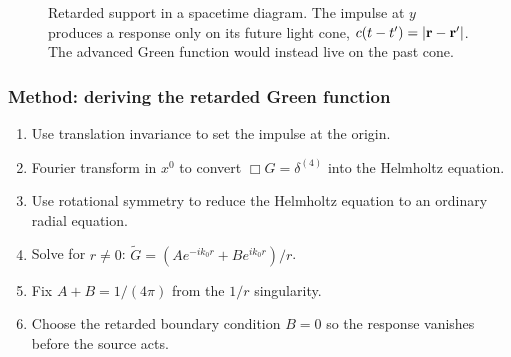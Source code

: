 \begin{figure}[h]
\centering
{}
\caption{Retarded support in a spacetime diagram. The impulse at $y$ produces a response only on its future light cone, $c(t-t')=|\mathbf{r}-\mathbf{r}'|$. The advanced Green function would instead live on the past cone.}
\label{fig:lec20-light-cone}
\end{figure}

\subsubsection*{Method: deriving the retarded Green function}
\begin{enumerate}
  \item Use translation invariance to set the impulse at the origin.
  \item Fourier transform in $x^0$ to convert $\Box G=\delta^{(4)}$ into the Helmholtz equation.
  \item Use rotational symmetry to reduce the Helmholtz equation to an ordinary radial equation.
  \item Solve for $r\neq0$: $\widetilde G=(Ae^{-ik_0r}+Be^{ik_0r})/r$.
  \item Fix $A+B=1/(4\pi)$ from the $1/r$ singularity.
  \item Choose the retarded boundary condition $B=0$ so the response vanishes before the source acts.
\end{enumerate}


